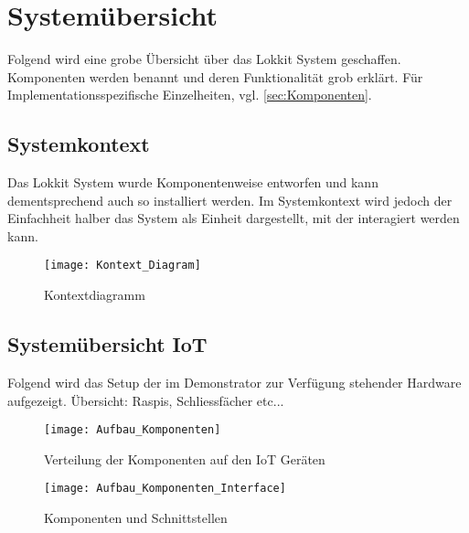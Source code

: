 \section{Systemübersicht}
Folgend wird eine grobe Übersicht über das Lokkit System geschaffen. Komponenten werden benannt und deren Funktionalität grob erklärt. Für Implementationsspezifische Einzelheiten, vgl. \ref{sec:Komponenten}.

\subsection{Systemkontext}
Das Lokkit System wurde Komponentenweise entworfen und kann dementsprechend auch so installiert werden. Im Systemkontext wird jedoch der Einfachheit halber das System als Einheit dargestellt, mit der interagiert werden kann.
\begin{figure}
\centering
\texttt{[image: Kontext\_Diagram]}
\caption{Kontextdiagramm}
\label{fig:Kontextdiagramm}
\end{figure}

\subsection{Systemübersicht IoT}
\label{subsec:Setup_IoT}
Folgend wird das Setup der im Demonstrator zur Verfügung stehender Hardware aufgezeigt.
Übersicht: Raspis, Schliessfächer etc...
\begin{figure}
\centering
\texttt{[image: Aufbau\_Komponenten]}
\caption{Verteilung der Komponenten auf den IoT Geräten}
\label{fig:Aufbau Komponenten}
\end{figure}

\begin{figure}
\centering
\texttt{[image: Aufbau\_Komponenten\_Interface]}
\caption{Komponenten und Schnittstellen}
\label{fig:Komponenten und Schnittstellen}
\end{figure}



